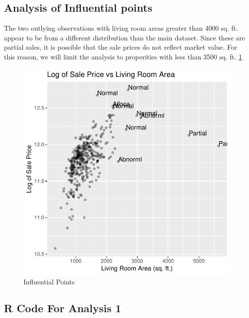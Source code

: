 \documentclass[american,]{article}
\begin{document}
\hypertarget{analysis-of-influential-points}{%
\subsection{Analysis of Influential
points}\label{analysis-of-influential-points}}

\label{appendix:infleu-points}

The two outlying observations with living room areas greater than 4000
sq. ft. appear to be from a different distribution than the main
dataset. Since these are partial sales, it is possible that the sale
prices do not reflect market value. For this reason, we will limit the
analysis to properities with less than 3500 sq. ft.
\ref{fig:infleu-points}

\begin{figure}[htbp]

{\centering \includegraphics[width=0.5\linewidth]{HousePriceRegressionAnalysis_files/figure-latex/infleu-points-1} 

}

\caption{Influential Points}\label{fig:infleu-points}
\end{figure}

\newpage

\hypertarget{r-code-for-analysis-1}{%
\subsection{R Code For Analysis 1}\label{r-code-for-analysis-1}}
\end{document}
